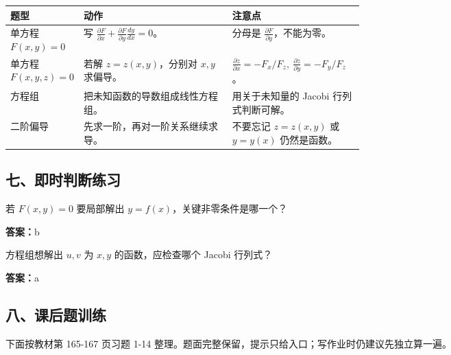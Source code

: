 \begin{center}
\small
\begin{tabularx}{\linewidth}{|>{\raggedright\arraybackslash}p{0.18\linewidth}|>{\raggedright\arraybackslash}p{0.42\linewidth}|>{\raggedright\arraybackslash}X|}
\hline
\textbf{题型} & \textbf{动作} & \textbf{注意点} \\ \hline
单方程 \(F(x,y)=0\) & 写 \(\frac{\partial F}{\partial x}+\frac{\partial F}{\partial y}\frac{dy}{dx}=0\)。 & 分母是 \(\frac{\partial F}{\partial y}\)，不能为零。 \\ \hline
单方程 \(F(x,y,z)=0\) & 若解 \(z=z(x,y)\)，分别对 \(x,y\) 求偏导。 & \(\frac{\partial z}{\partial x}=-F_x/F_z,\ \frac{\partial z}{\partial y}=-F_y/F_z\)。 \\ \hline
方程组 & 把未知函数的导数组成线性方程组。 & 用关于未知量的 Jacobi 行列式判断可解。 \\ \hline
二阶偏导 & 先求一阶，再对一阶关系继续求导。 & 不要忘记 \(z=z(x,y)\) 或 \(y=y(x)\) 仍然是函数。 \\ \hline
\end{tabularx}
\end{center}

\subsection*{七、即时判断练习}

\begin{quickcheck}
若 \(F(x,y)=0\) 要局部解出 \(y=f(x)\)，关键非零条件是哪一个？

\tcblower
\textbf{答案：}b
\end{quickcheck}

\begin{quickcheck}
方程组想解出 \(u,v\) 为 \(x,y\) 的函数，应检查哪个 Jacobi 行列式？

\tcblower
\textbf{答案：}a
\end{quickcheck}

\subsection*{八、课后题训练}

下面按教材第 165-167 页习题 1-14 整理。题面完整保留，提示只给入口；写作业时仍建议先独立算一遍。

